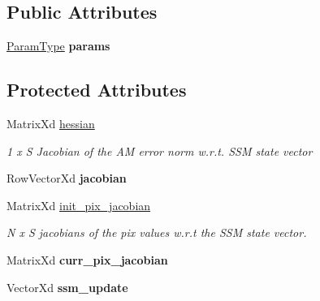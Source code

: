 \subsection*{Public Attributes}
\begin{DoxyCompactItemize}
\item 
\hypertarget{classFCGD_a4148c07ff3804cc51378256352cd9357}{\hyperlink{structFCGDParams}{Param\-Type} {\bfseries params}}\label{classFCGD_a4148c07ff3804cc51378256352cd9357}

\end{DoxyCompactItemize}
\subsection*{Protected Attributes}
\begin{DoxyCompactItemize}
\item 
\hypertarget{classFCGD_a761e40c1ebe46b7e62a3fa75da150b96}{Matrix\-Xd \hyperlink{classFCGD_a761e40c1ebe46b7e62a3fa75da150b96}{hessian}}\label{classFCGD_a761e40c1ebe46b7e62a3fa75da150b96}

\begin{DoxyCompactList}\small\item\em 1 x S Jacobian of the A\-M error norm w.\-r.\-t. S\-S\-M state vector \end{DoxyCompactList}\item 
\hypertarget{classFCGD_a22e06e9ffa6592724a2f24e843d7228b}{Row\-Vector\-Xd {\bfseries jacobian}}\label{classFCGD_a22e06e9ffa6592724a2f24e843d7228b}

\item 
\hypertarget{classFCGD_a29be26fe5db90f44157504d3b59267c5}{Matrix\-Xd \hyperlink{classFCGD_a29be26fe5db90f44157504d3b59267c5}{init\-\_\-pix\-\_\-jacobian}}\label{classFCGD_a29be26fe5db90f44157504d3b59267c5}

\begin{DoxyCompactList}\small\item\em N x S jacobians of the pix values w.\-r.\-t the S\-S\-M state vector. \end{DoxyCompactList}\item 
\hypertarget{classFCGD_a736050ed3c0120bfc4ce43fc120074c7}{Matrix\-Xd {\bfseries curr\-\_\-pix\-\_\-jacobian}}\label{classFCGD_a736050ed3c0120bfc4ce43fc120074c7}

\item 
\hypertarget{classFCGD_aa3859a59b58f94cc267b7ea1a17431f9}{Vector\-Xd {\bfseries ssm\-\_\-update}}\label{classFCGD_aa3859a59b58f94cc267b7ea1a17431f9}


\end{DoxyCompactItemize}
